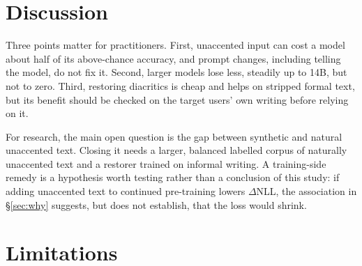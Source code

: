 \documentclass[conference]{IEEEtran}
\begin{document}
\section{Discussion}

Three points matter for practitioners. First, unaccented input can cost a model about half of its above-chance accuracy, and prompt changes, including telling the model, do not fix it. Second, larger models lose less, steadily up to 14B, but not to zero. Third, restoring diacritics is cheap and helps on stripped formal text, but its benefit should be checked on the target users' own writing before relying on it.

For research, the main open question is the gap between synthetic and natural unaccented text. Closing it needs a larger, balanced labelled corpus of naturally unaccented text and a restorer trained on informal writing. A training-side remedy is a hypothesis worth testing rather than a conclusion of this study: if adding unaccented text to continued pre-training lowers $\Delta$NLL, the association in \S\ref{sec:why} suggests, but does not establish, that the loss would shrink.

\section{Limitations}
\end{document}
